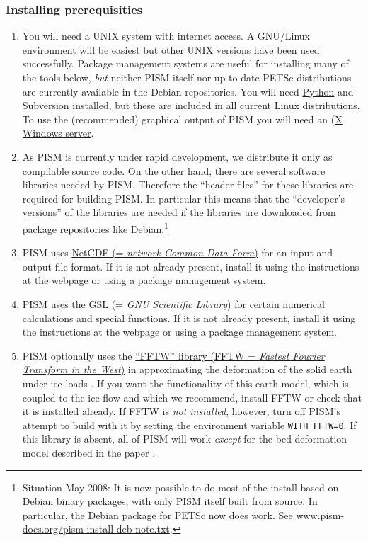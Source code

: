 \documentclass[11pt,final]{amsart}
\begin{document}
\subsubsection*{Installing prerequisities}
\renewcommand{\labelenumi}{\textbf{\arabic{enumi}.}~}
\begin{enumerate}
\item You will need a UNIX system with internet access.  A GNU/Linux environment will be easiest but other UNIX versions have been used successfully.  Package management systems are useful for installing many of the tools below, \emph{but} neither PISM itself nor up-to-date PETSc distributions are currently available in the Debian repositories.  You will need \href{http://www.python.org/}{Python} and \href{http://subversion.tigris.org/}{Subversion} installed, but these are included in all current Linux distributions.  To use the (recommended) graphical output of PISM you will need an  (\href{http://www.x.org/}{X Windows server}.
\item As PISM is currently under rapid development, we distribute it only as compilable source code.  On the other hand, there are several software libraries needed by PISM.  Therefore the ``header files'' for these libraries are required for building PISM.  In particular this means that the ``developer's versions'' of the libraries are needed if the libraries are downloaded from package repositories like Debian.\footnote{Situation May 2008:  It is now possible to do most of the install based on Debian binary packages, with only PISM itself built from source.  In particular, the Debian package for PETSc now does work.  See \href{http://www.pism-docs.org/pism-install-deb-note.txt}{www.pism-docs.org/pism-install-deb-note.txt}.}

\item PISM uses \href{http://www.unidata.ucar.edu/software/netcdf/}{NetCDF (= \emph{network Common Data Form})} for an input and output file format.   If it is not already present, install it using the instructions at the webpage or using a package management system.

\item PISM uses the \href{http://www.gnu.org/software/gsl/}{GSL (= \emph{GNU Scientific Library})} for certain numerical calculations and special functions.  If it is not already present, install it using the instructions at the webpage or using a package management system.

\item PISM optionally uses the \href{http://www.fftw.org/}{``FFTW'' library (FFTW = \emph{Fastest Fourier Transform in the West})} in approximating the deformation of the solid earth under ice loads \cite{BLKfastearth}.  If you want the functionality of this earth model, which is coupled to the ice flow and which we recommend, install FFTW or check that it is installed already.  If FFTW is \emph{not installed}, however, turn off PISM's attempt to build with it by setting the environment variable \verb|WITH_FFTW=0|.   If this library is absent, all of PISM will work \emph{except} for the bed deformation model described in the paper \cite{BLKfastearth}.


\end{enumerate}
\end{document}
